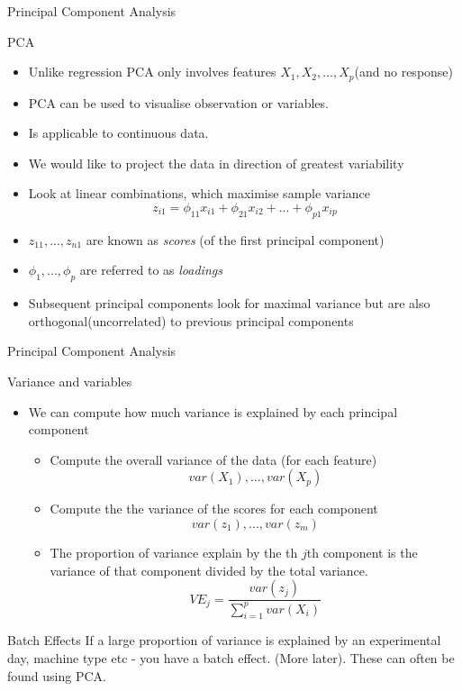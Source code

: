 \documentclass{bredelebeamer}
\begin{document}
\begin{frame}{Principal Component Analysis}
\begin{exampleblock}{PCA}
\begin{itemize}
\item Unlike regression PCA only involves features $X_1,X_2,...,X_p$(and no response)
\item PCA can be used to visualise observation or variables.
\item Is applicable to continuous data.
\item We would like to project the data in direction of greatest variability
\item Look at linear combinations, which maximise sample variance
\begin{equation}
z_{i1} = \phi_{11}x_{i1} + \phi_{21}x_{i2} + ... + \phi_{p1} x_{ip}
\end{equation}
\item $z_{11},...,z_{n1}$ are known as \textit{scores} (of the first principal component)
\item $\phi_1,..., \phi_p$ are referred to as \textit{loadings}
\item Subsequent principal components look for maximal variance but are also orthogonal(uncorrelated) to previous principal components
\end{itemize}
\end{exampleblock}
\end{frame}
\begin{frame}{Principal Component Analysis}
\begin{exampleblock}{Variance and variables}
	\begin{itemize}
	\item We can compute how much variance is explained by each principal component
	\begin{itemize}
	\item Compute the overall variance of the data (for each feature)
	\begin{equation}
	var(X_1),..., var(X_p)
	\end{equation}
	\item Compute the the variance of the scores for each component
	\begin{equation}
	var(z_1),..., var(z_m)
	\end{equation}
	\item The proportion of variance explain by the th $j$th component is the variance of that component divided by the total variance.
	\begin{equation}
	VE_j = \frac{var(z_j)}{\sum_{i =1}^{p} var(X_i)}
	\end{equation}
	\end{itemize}
	\end{itemize}
\end{exampleblock}

\begin{alertblock}{Batch Effects}
If a large proportion of variance is explained by an experimental day, machine type etc - you have a batch effect. (More later). These can often be found using PCA.
\end{alertblock}

\end{frame}
\end{document}
